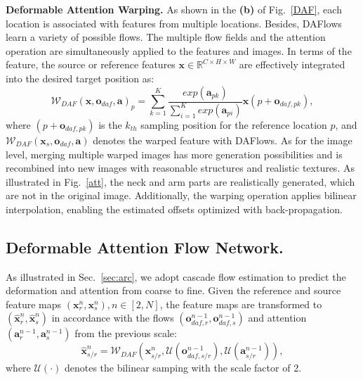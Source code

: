\documentclass[runningheads]{llncs}
\begin{document}
\textbf{Deformable Attention Warping.} 
As shown in the \textbf{(b)} of Fig.~\ref{DAF}, each location is associated with features from multiple locations. Besides, DAFlows learn a variety of possible flows. The multiple flow fields and the attention operation are simultaneously applied to the features and images. In terms of the feature, the source or reference features $\bm{x} \in \mathbb{R}^{C\times H\times W}$ are effectively integrated into the desired target position as:
\begin{equation}
\mathcal{W}_{DAF}(\bm{x},\bm{o}_{daf},\bm{a})_p= \sum_{k=1}^{K}\frac{exp(\bm{a}_{pk})}{\sum_{i=1}^{K} exp(\bm{a}_{pi})} \bm{x}(p+ \bm{o}_{daf,pk}),
\end{equation}
where $(p+ \bm{o}_{daf,pk})$ is the $k_{th}$ sampling position for the reference location $p$, and  $\mathcal{W}_{DAF}(\bm{x}_s,\bm{o}_{daf},\bm{a}) $ denotes the warped feature with DAFlows. As for the image level, merging multiple warped images has more generation possibilities and is recombined into new images with reasonable structures and realistic textures. As illustrated in Fig.~\ref{att}, the neck and arm parts are realistically generated, which are not in the original image. Additionally, the warping operation applies bilinear interpolation, enabling the estimated offsets optimized with back-propagation. 


\subsection{Deformable Attention Flow Network.}
As illustrated in Sec.~\ref{sec:arc}, we adopt cascade flow estimation to predict the deformation and attention from coarse to fine. Given the reference and source feature maps $(\bm{x}_r^n,\bm{x}_s^n),n\in [2,N]$, the feature maps are transformed to $(\bm{\hat{x}}_r^n,\bm{\hat{x}}_s^n)$ in accordance with the flows  $(\bm{o}_{daf,r}^{n-1}, \bm{o}_{daf,s}^{n-1})$ and attention $(\bm{a}^{n-1}_r,\bm{a}^{n-1}_s)$ from the previous scale:
\begin{equation}
\hat{\bm{x}}_{s/r}^n = \mathcal{W}_{DAF}(\bm{x}^{n}_{s/r},\mathcal{U}(\bm{o}_{daf,{s/r}}^{n-1}),\mathcal{U}(\bm{a}_{s/r}^{n-1})),
\end{equation}
where $\mathcal{U}(\cdot)$ denotes the bilinear samping with the scale factor of 2.
\end{document}

